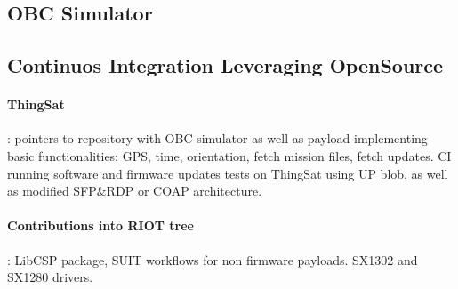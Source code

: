 \subsection{OBC Simulator}

\subsection{Continuos Integration \- Leveraging OpenSource}
\paragraph*{ThingSat}: pointers to repository with OBC-simulator as well as payload
implementing basic functionalities: GPS, time, orientation, fetch mission files, fetch updates.
CI running software and firmware updates tests on ThingSat using UP blob, as well
as modified SFP\&RDP or COAP architecture.
\paragraph*{Contributions into RIOT tree}: LibCSP package, SUIT workflows for non
firmware payloads. SX1302 and SX1280 drivers.

